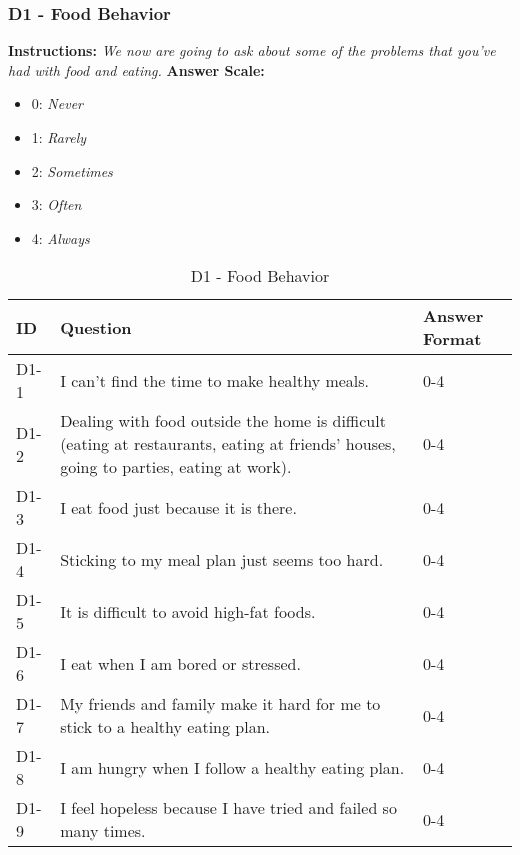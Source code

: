 \subsubsection{D1 - Food Behavior}
\textbf{Instructions:} \emph{We now are going to ask about some of the problems that you've had with food and eating.}
\textbf{Answer Scale:}
\begin{itemize}
    \item 0: \emph{Never}
    \item 1: \emph{Rarely}
    \item 2: \emph{Sometimes}
    \item 3: \emph{Often}
    \item 4: \emph{Always}
\end{itemize}
\begin{table}[H]
    \centering
    \renewcommand{\arraystretch}{1.2}
    \begin{tabularx}{\textwidth}{|l|X|l|}
        \hline
        \textbf{ID} & \textbf{Question} & \textbf{Answer Format} \\ \hline
        D1-1 & I can't find the time to make healthy meals. & 0-4 \\ \hline
        D1-2 & Dealing with food outside the home is difficult (eating at restaurants, eating at friends' houses, going to parties, eating at work). & 0-4 \\ \hline
        D1-3 & I eat food just because it is there. & 0-4 \\ \hline
        D1-4 & Sticking to my meal plan just seems too hard. & 0-4 \\ \hline
        D1-5 & It is difficult to avoid high-fat foods. & 0-4 \\ \hline
        D1-6 & I eat when I am bored or stressed. & 0-4 \\ \hline
        D1-7 & My friends and family make it hard for me to stick to a healthy eating plan. & 0-4 \\ \hline
        D1-8 & I am hungry when I follow a healthy eating plan. & 0-4 \\ \hline
        D1-9 & I feel hopeless because I have tried and failed so many times. & 0-4 \\ \hline
    \end{tabularx}
    \caption{D1 - Food Behavior}
    \label{tab:food-behavior}
\end{table}


